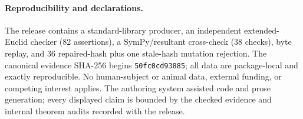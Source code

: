 \documentclass[10pt]{article}
\begin{document}
\paragraph{Reproducibility and declarations.}
The release contains a standard-library producer, an independent extended-Euclid checker (82 assertions), a SymPy/resultant cross-check (38 checks), byte replay, and 36 repaired-hash plus one stale-hash mutation rejection.  The canonical evidence SHA-256 begins \texttt{50fc0cd93885}; all data are package-local and exactly reproducible.  No human-subject or animal data, external funding, or competing interest applies.  The authoring system assisted code and prose generation; every displayed claim is bounded by the checked evidence and internal theorem audits recorded with the release.
\end{document}
